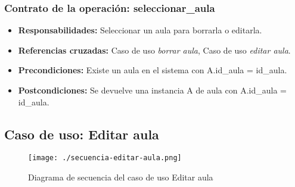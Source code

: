 \subsubsection{Contrato de la operación: seleccionar\_aula}
\begin{itemize}
\item {\bf Responsabilidades:} Seleccionar un aula para borrarla o editarla.
\item {\bf Referencias cruzadas:} Caso de uso {\em borrar aula}, Caso de uso {\em editar aula}.
\item {\bf Precondiciones:} Existe un aula en el sistema con A.id\_aula = id\_aula.
\item {\bf Postcondiciones:} Se devuelve una instancia A de aula con A.id\_aula = id\_aula.
\end{itemize}

\subsection{Caso de uso: Editar aula}
\begin{figure}[H] 
  \label{comportamiento-editar-aula} 
	\begin{center}
    \texttt{[image: ./secuencia-editar-aula.png]}
  \end{center}
\caption{Diagrama de secuencia del caso de uso Editar aula}
\end{figure}
